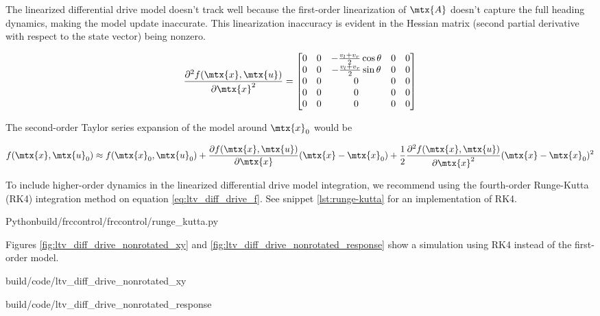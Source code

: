 The linearized differential drive model doesn't track well because the
first-order linearization of $\mtx{A}$ doesn't capture the full heading
dynamics, making the \gls{model} update inaccurate. This linearization
inaccuracy is evident in the Hessian matrix (second partial derivative with
respect to the state vector) being nonzero.

\begin{equation*}
  \frac{\partial^2 f(\mtx{x}, \mtx{u})}{\partial\mtx{x}^2} =
  \begin{bmatrix}
    0 & 0 & -\frac{v_l + v_r}{2}\cos\theta & 0 & 0 \\
    0 & 0 & -\frac{v_l + v_r}{2}\sin\theta & 0 & 0 \\
    0 & 0 & 0 & 0 & 0 \\
    0 & 0 & 0 & 0 & 0 \\
    0 & 0 & 0 & 0 & 0
  \end{bmatrix}
\end{equation*}

The second-order Taylor series expansion of the \gls{model} around $\mtx{x}_0$
would be

\begin{equation*}
  f(\mtx{x}, \mtx{u}_0) \approx f(\mtx{x}_0, \mtx{u}_0) +
    \frac{\partial f(\mtx{x}, \mtx{u})}{\partial\mtx{x}}(\mtx{x} - \mtx{x}_0) +
    \frac{1}{2}\frac{\partial^2 f(\mtx{x}, \mtx{u})}{\partial\mtx{x}^2}
    (\mtx{x} - \mtx{x}_0)^2
\end{equation*}

To include higher-order dynamics in the linearized differential drive model
integration, we recommend using the fourth-order Runge-Kutta (RK4) integration
method on equation \eqref{eq:ltv_diff_drive_f}. See snippet
\ref{lst:runge-kutta} for an implementation of RK4.

\begin{code}{Python}{build/frccontrol/frccontrol/runge_kutta.py}
  \caption{Fourth-order Runge-Kutta integration in Python}
  \label{lst:runge-kutta}
\end{code}

Figures \ref{fig:ltv_diff_drive_nonrotated_xy} and
\ref{fig:ltv_diff_drive_nonrotated_response} show a simulation using RK4
instead of the first-order \gls{model}.

\begin{bookfigure}
  \begin{minisvg}{2}{build/code/ltv_diff_drive_nonrotated_xy}
    \caption{Linear time-varying differential drive controller (global reference
        frame formulation) x-y plot}
    \label{fig:ltv_diff_drive_nonrotated_xy}
  \end{minisvg}
  \hfill
  \begin{minisvg}{2}{build/code/ltv_diff_drive_nonrotated_response}
    \caption{Linear time-varying differential drive controller (global reference
        frame formulation) response}
    \label{fig:ltv_diff_drive_nonrotated_response}
  \end{minisvg}
\end{bookfigure}

